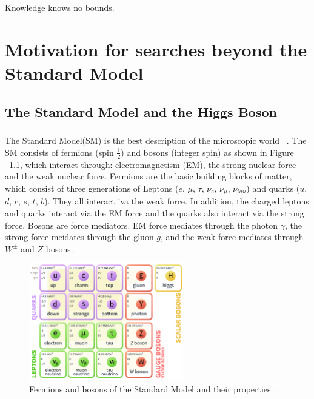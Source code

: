 \begin{savequote}[75mm]
Knowledge knows no bounds.
\end{savequote}

\chapter{Motivation for searches beyond the Standard Model}

\section{The Standard Model and the Higgs Boson}
\paragraph{}
The Standard Model(SM) is the best description of the microscopic world ~\cite{Griffiths,Tully,Pdg,Schwartz}. 
The SM consists of fermions (spin $\frac{1}{2}$) and bosons (integer spin) as shown in Figure ~\ref{fig:SM}, which interact through: electromagnetism (EM), the strong nuclear force and the weak nuclear force.
Fermions are the basic building blocks of matter, which consist of three generations of Leptons ($e$, $\mu$, $\tau$, $\nu_e$, $\nu_{\mu}$, $\nu_{tau}$) and quarks ($u$, $d$, $c$, $s$, $t$, $b$). 
They all interact iva the weak force. In addition, the charged leptons and quarks interact via the EM force and the quarks also interact via the strong force.
Bosons are force mediators. EM force mediates through the photon $\gamma$, the strong force meidates through the gluon $g$, and the weak force mediates through $W^{\pm}$ and $Z$ bosons.

\begin{figure}[h!]
  \centering
  \captionsetup{justification=centering}
  \includegraphics[width=0.6\textwidth]{figures/theory/SM}
  \caption{Fermions and bosons of the Standard Model and their properties~\cite{Pdg}.}
  \label{fig:SM}
\end{figure}

